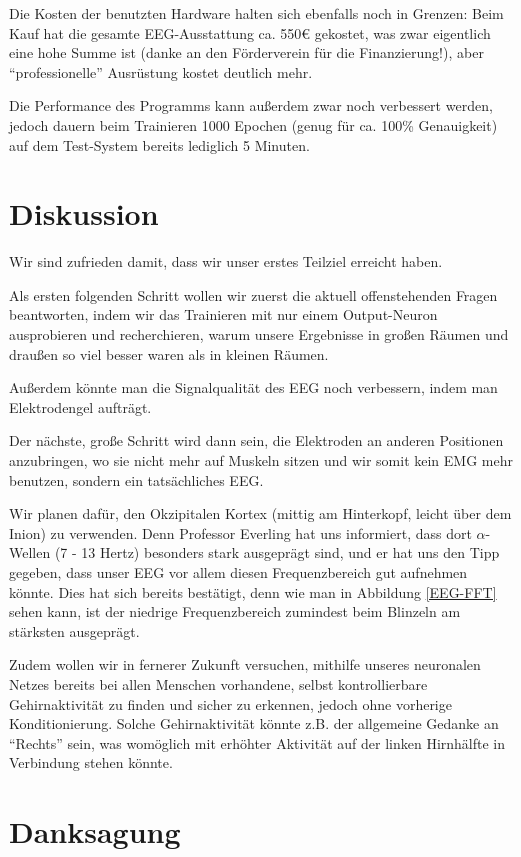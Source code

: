 \documentclass{scrartcl}
\begin{document}
	Die Kosten der benutzten Hardware halten sich ebenfalls noch in Grenzen: Beim Kauf hat die gesamte EEG-Ausstattung ca. 550€ gekostet, was zwar eigentlich eine hohe Summe ist (danke an den Förderverein für die Finanzierung!), aber \enquote{professionelle} Ausrüstung kostet deutlich mehr.

	Die Performance des Programms kann außerdem zwar noch verbessert werden, jedoch dauern beim Trainieren 1000 Epochen (genug für ca. 100\% Genauigkeit) auf dem Test-System bereits lediglich 5 Minuten. 

	\section{Diskussion}

	Wir sind zufrieden damit, dass wir unser erstes Teilziel erreicht haben.

	Als ersten folgenden Schritt wollen wir zuerst die aktuell offenstehenden Fragen beantworten, indem wir das Trainieren mit nur einem Output-Neuron ausprobieren und recherchieren, warum unsere Ergebnisse in großen Räumen und draußen so viel besser waren als in kleinen Räumen.

	Außerdem könnte man die Signalqualität des EEG noch verbessern, indem man Elektrodengel aufträgt. 

	Der nächste, große Schritt wird dann sein, die Elektroden an anderen Positionen anzubringen, wo sie nicht mehr auf Muskeln sitzen und wir somit kein EMG mehr benutzen, sondern ein tatsächliches EEG.

	Wir planen dafür, den Okzipitalen Kortex (mittig am Hinterkopf, leicht über dem Inion) zu verwenden. Denn Professor Everling hat uns informiert, dass dort $\alpha$-Wellen (7 - 13 Hertz) besonders stark ausgeprägt sind, und er hat uns den Tipp gegeben, dass unser EEG vor allem diesen Frequenzbereich gut aufnehmen könnte. Dies hat sich bereits bestätigt, denn wie man in Abbildung \ref{EEG-FFT} sehen kann, ist der niedrige Frequenzbereich zumindest beim Blinzeln am stärksten ausgeprägt.

	Zudem wollen wir in fernerer Zukunft versuchen, mithilfe unseres neuronalen Netzes bereits bei allen Menschen vorhandene, selbst kontrollierbare Gehirnaktivität zu finden und sicher zu erkennen, jedoch ohne vorherige Konditionierung. Solche Gehirnaktivität könnte z.B. der allgemeine Gedanke an \enquote{Rechts} sein, was womöglich mit erhöhter Aktivität auf der linken Hirnhälfte in Verbindung stehen könnte.
	
	\section{Danksagung}
\end{document}
